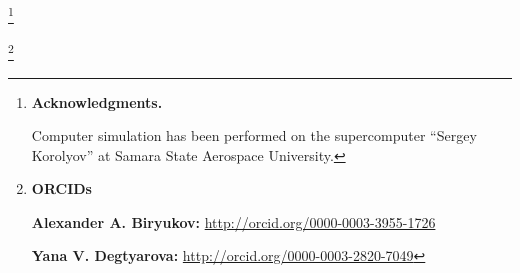 \thanks{\textbf{Acknowledgments.} 

Computer simulation has been performed on the supercomputer ``Sergey Korolyov'' at Samara State Aerospace University.}



\thanks{{\bf ORCIDs}



{\bf Alexander A. Biryukov:} \url{http://orcid.org/0000-0003-3955-1726}



{\bf Yana V. Degtyarova:} \url{http://orcid.org/0000-0003-2820-7049}



}





\pagebreak





\EngRef



